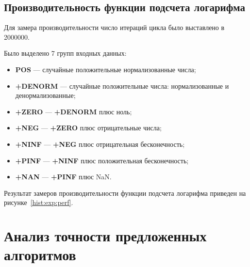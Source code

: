 \subsection{Производительность функции подсчета логарифма}

Для замера производительности число итераций цикла было выставлено в 2000000.

Было выделено 7 групп входных данных:

\begin{itemize}
    \item \textbf{POS} --- случайные положительные нормализованные числа;
    \item \textbf{+DENORM} --- случайные положительные числа: нормализованные и денормализованные;
    \item \textbf{+ZERO} --- \textbf{+DENORM} плюс ноль;
    \item \textbf{+NEG} --- \textbf{+ZERO} плюс отрицательные числа;
    \item \textbf{+NINF} --- \textbf{+NEG} плюс отрицательная бесконечность;
    \item \textbf{+PINF} --- \textbf{+NINF} плюс положительная бесконечность;
    \item \textbf{+NAN} --- \textbf{+PINF} плюс NaN.
\end{itemize}

Результат замеров производительности функции подсчета логарифма приведен на рисунке~\ref{hist:exp:perf}.

\section{Анализ точности предложенных алгоритмов}

